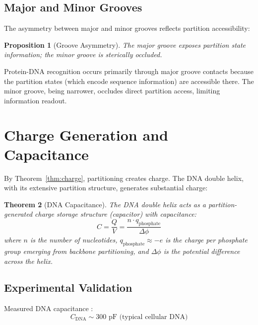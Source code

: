 \documentclass[twocolumn,10pt,a4paper]{article}
\newtheorem{theorem}{Theorem}[section]
\newtheorem{proposition}[theorem]{Proposition}
\theoremstyle{definition}
\theoremstyle{remark}
\begin{document}
\subsection{Major and Minor Grooves}

The asymmetry between major and minor grooves reflects partition accessibility:

\begin{proposition}[Groove Asymmetry]
\label{prop:grooves}
The major groove exposes partition state information; the minor groove is sterically occluded.
\end{proposition}

Protein-DNA recognition occurs primarily through major groove contacts because the partition states (which encode sequence information) are accessible there. The minor groove, being narrower, occludes direct partition access, limiting information readout.

\section{Charge Generation and Capacitance}
\label{sec:capacitance}

By Theorem~\ref{thm:charge}, partitioning creates charge. The DNA double helix, with its extensive partition structure, generates substantial charge:

\begin{theorem}[DNA Capacitance]
\label{thm:capacitance}
The DNA double helix acts as a partition-generated charge storage structure (capacitor) with capacitance:
\begin{equation}
    C = \frac{Q}{V} = \frac{n \cdot q_{\text{phosphate}}}{\Delta\phi}
\end{equation}
where $n$ is the number of nucleotides, $q_{\text{phosphate}} \approx -e$ is the charge per phosphate group emerging from backbone partitioning, and $\Delta\phi$ is the potential difference across the helix.
\end{theorem}

\subsection{Experimental Validation}

Measured DNA capacitance \cite{kornyshev2007}:
\begin{equation}
    C_{\text{DNA}} \sim 300 \text{ pF (typical cellular DNA)}
\end{equation}
\end{document}
